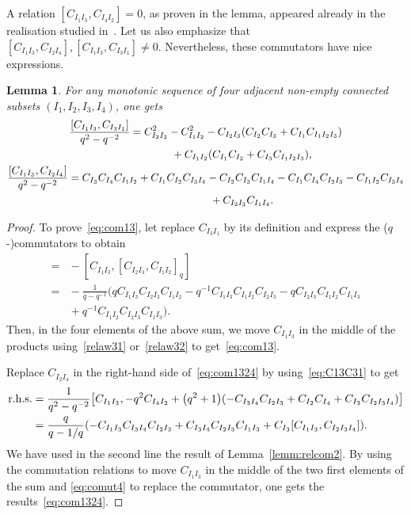 \documentclass[pdftex]{sigma}
\numberwithin{equation}{section}
\newtheorem{lemm}[theo]{Lemma}
\theoremstyle{definition}
\begin{document}
A relation $[C_{I_1I_3}, C_{I_4I_2} ]=0$, as proven in the lemma, appeared already in the realisation studied in~\cite{PostWalt}.
Let us also emphasize that $[C_{I_1I_3}, C_{I_2I_4} ], [C_{I_1I_3}, C_{I_3I_1} ]\neq 0$. Nevertheless, these commutators have nice expressions.
\begin{lemm}\label{lem:ff}For any monotonic sequence of four adjacent non-empty connected subsets $(I_1,I_2,\allowbreak I_3,I_4)$, one gets
\begin{gather}
\frac{[C_{I_1I_3}, C_{I_3I_1} ]}{q^2-q^{-2}}= C_{I_2I_3}^2 -C_{I_1I_2}^2 - C_{I_2I_3}(C_{I_2}C_{I_3}+C_{I_1}C_{I_1I_2I_3}) \nonumber\\
\hphantom{\frac{[C_{I_1I_3}, C_{I_3I_1} ]}{q^2-q^{-2}}=}{}+ C_{I_1I_2}(C_{I_1}C_{I_2}+C_{I_3}C_{I_1I_2I_3} ) ,\label{eq:com13} \\
 \frac{[C_{I_1I_3}, C_{I_2I_4} ]}{q^2-q^{-2}}= C_{I_3} C_{I_4}C_{I_{1}I_2}+C_{I_1} C_{I_2}C_{I_3I_4}-C_{I_2} C_{I_3}C_{I_1I_4}-C_{I_1} C_{I_4}C_{I_2I_3} -C_{I_1I_2}C_{I_3I_4}\nonumber\\
\hphantom{\frac{[C_{I_1I_3}, C_{I_2I_4} ]}{q^2-q^{-2}}=}{}+C_{I_2I_3}C_{I_1I_4}.\label{eq:com1324}
 \end{gather}
\end{lemm}
\begin{proof} To prove~\eqref{eq:com13}, let replace $C_{I_3I_1}$ by its definition and express the ($q$-)commutators to obtain
\begin{align*}
[C_{I_1I_3}, C_{I_3I_1} ]={}&{}-[C_{I_1I_3}, [C_{I_2I_3},C_{I_1I_2}]_q ]\\
={}&{}-\frac{1}{q-q^{-1}}\big(qC_{I_1I_3}C_{I_2I_3}C_{I_1I_2}-q^{-1}C_{I_1I_3}C_{I_1I_2}C_{I_2I_3}-qC_{I_2I_3}C_{I_1I_2}C_{I_1I_3}\\
&{}+q^{-1}C_{I_1I_2}C_{I_2I_3}C_{I_1I_3}\big).
\end{align*}
Then, in the four elements of the above sum, we move $C_{I_1I_3}$ in the middle of the products using~\eqref{relaw31}
or~\eqref{relaw32} to get~\eqref{eq:com13}.

Replace $C_{I_2I_4}$ in the right-hand side of~\eqref{eq:com1324} by using~\eqref{eq:C13C31} to get
\begin{align*}
 {\rm r.h.s.}&=\frac{1}{q^2-q^{-2}} \big[C_{I_1I_3}, -q^2C_{I_4I_2}+\big(q^2+1\big)(-C_{I_3I_4}C_{I_2I_3}+C_{I_2}C_{I_4}+C_{I_3}C_{I_2I_3I_4}) \big]\\
 &=\frac{q}{q-1/q} ( -C_{I_1I_3}C_{I_3I_4}C_{I_2I_3}+C_{I_3I_4}C_{I_2I_3}C_{I_1I_3}+C_{I_3}[C_{I_1I_3},C_{I_2I_3I_4} ] ).
\end{align*}
We have used in the second line the result of Lemma~\ref{lemm:relcom2}. By using the commutation relations to move $C_{I_1I_3}$ in the middle of the two first elements of the sum and
\eqref{eq:comut4} to replace the commutator, one gets the results~\eqref{eq:com1324}.
\end{proof}
\end{document}
